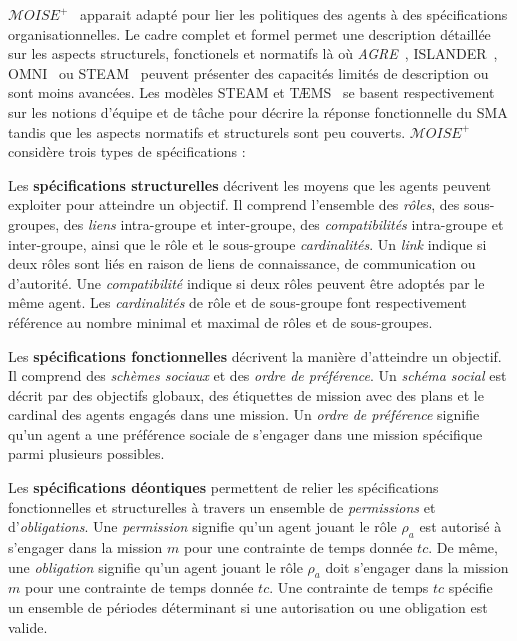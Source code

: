 \documentclass[contribution]{jfsma}
\begin{document}
% 


$\mathcal{M}OISE^+$~\cite{Hubner2007} apparait adapté pour lier les politiques des agents à des spécifications organisationnelles.
Le cadre complet et formel permet une description détaillée sur les aspects structurels, fonctionels et normatifs là où \emph{AGRE}~\cite{Ferber2004}, ISLANDER~\cite{Esteva2002}, OMNI~\cite{Dignum2005} ou STEAM~\cite{Tambe1999} peuvent présenter des capacités limités de description ou sont moins avancées.
Les modèles STEAM et TÆMS~\cite{Vincent2000} se basent respectivement sur les notions d'équipe et de tâche pour décrire la réponse fonctionnelle du SMA tandis que les aspects normatifs et structurels sont peu couverts.
$\mathcal{M}OISE^+$ considère trois types de spécifications :

Les \textbf{spécifications structurelles} décrivent les moyens que les agents peuvent exploiter pour atteindre un objectif. Il comprend l'ensemble des \emph{rôles}, des sous-groupes, des \emph{liens} intra-groupe et inter-groupe, des \emph{compatibilités} intra-groupe et inter-groupe, ainsi que le rôle et le sous-groupe \emph {cardinalités}.
Un \emph{link} indique si deux rôles sont liés en raison de liens de connaissance, de communication ou d'autorité. Une \emph{compatibilité} indique si deux rôles peuvent être adoptés par le même agent. Les \emph{cardinalités} de rôle et de sous-groupe font respectivement référence au nombre minimal et maximal de rôles et de sous-groupes.

Les \textbf{spécifications fonctionnelles} décrivent la manière d'atteindre un objectif. Il comprend des \emph{schèmes sociaux} et des \emph{ordre de préférence}. Un \emph{schéma social} est décrit par des objectifs globaux, des étiquettes de mission avec des plans et le cardinal des agents engagés dans une mission. Un \emph{ordre de préférence} signifie qu'un agent a une préférence sociale de s'engager dans une mission spécifique parmi plusieurs possibles.

Les \textbf{spécifications déontiques} permettent de relier les spécifications fonctionnelles et structurelles à travers un ensemble de \emph{permissions} et d'\emph{obligations}. Une \emph{permission} signifie qu'un agent jouant le rôle $\rho_a$ est autorisé à s'engager dans la mission $m$ pour une contrainte de temps donnée $tc$. De même, une \emph{obligation} signifie qu'un agent jouant le rôle $\rho_a$ doit s'engager dans la mission $m$ pour une contrainte de temps donnée $tc$. Une contrainte de temps $tc $ spécifie un ensemble de périodes déterminant si une autorisation ou une obligation est valide.
\end{document}
